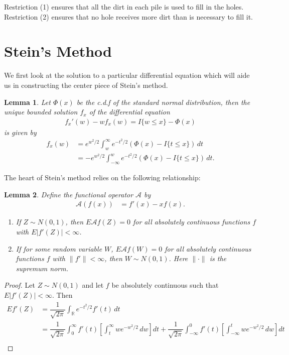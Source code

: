 \documentclass[11pt]{article}
\newtheorem{lemma}{Lemma}
\begin{document}
\begin{flushleft}
Restriction (1) ensures that all the dirt in each pile is used to fill in the holes. Restriction (2) ensures that
no hole receives more dirt than is necessary to fill it.

\section{Stein's Method}
We first look at the solution to a particular differential equation
which will aide us in constructing the center piece of Stein's method.
\begin{lemma}
Let $\Phi(x)$ be the c.d.f of the standard normal distribution, then the unique
bounded solution $f_x$ of the differential equation 
\begin{align*}
f_x'(w) - wf_x(w) = I\{w \leq x\} - \Phi(x)
\end{align*}
is given by
\begin{align*}
f_x(w) &= e^{w^2/2} \int_{w}^{\infty} e^{-t^2/2} (\Phi(x) - I\{t \leq x\}) \, dt\\
&= -e^{w^2/2} \int_{-\infty}^{w} e^{-t^2/2} (\Phi(x) - I\{t \leq x\}) \, dt.
\end{align*}
\end{lemma}
The heart of Stein's method relies on the following relationship:
\begin{lemma}
Define the functional operator $\mathcal{A}$ by
\begin{align*}
\mathcal{A}(f(x)) &= f'(x) - xf(x).
\end{align*}
\begin{enumerate}
\item[1]
If $Z \sim N(0,1)$, then $E \mathcal{A} f(Z) = 0$ for all absolutely continuous
functions $f$ with $E|f'(Z)| < \infty$.
\item[2]
If for some random variable $W$, $E\mathcal{A}f(W) = 0$ for all absolutely continuous functions $f$
with $\|f'\|  < \infty$, then $W \sim N(0,1)$. Here $\| \cdot \|$ is the supremum norm.
\end{enumerate}
\end{lemma}
\begin{proof}
Let $Z \sim N(0,1)$ and let $f$ be absolutely continuous such that $E|f'(Z)| < \infty$. Then
\begin{align*}
Ef'(Z) &= \dfrac{1}{\sqrt{2\pi}} \int_{\mathbb{R}} e^{-t^2/2} f'(t) \, dt\\
&= \dfrac{1}{\sqrt{2\pi}} \int_{0}^{\infty} f'(t) \left[ \int_{t}^{\infty} we^{-w^2/2}\, dw \right] dt
+ \dfrac{1}{\sqrt{2\pi}} \int_{-\infty}^{0} f'(t) \left[ \int_{-\infty}^{t} we^{-w^2/2}\, dw \right] dt\\

\end{align*}
\end{proof}
\end{flushleft}
\end{document}
